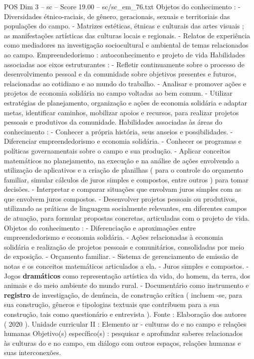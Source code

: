 \begin{textsample}{POS Dim 3 – sc – Score 19.00 – sc/sc\_em\_76.txt}
Objetos do conhecimento : - Diversidades étnico-raciais, de gênero, geracionais, sexuais e territoriais das populações do campo. - Matrizes estéticas, étnicas e culturais das artes visuais ; as manifestações artísticas das culturas locais e regionais. - Relatos de experiência como mediadores na investigação sociocultural e ambiental de temas relacionados ao campo.
Empreendedorismo : autoconhecimento e projeto de vida Habilidades associadas aos eixos estruturantes : - Refletir continuamente sobre o processo de desenvolvimento pessoal e da comunidade sobre objetivos presentes e futuros, relacionadas ao cotidiano e ao mundo do trabalho. - Analisar e promover ações e projetos de economia solidária no campo voltadas ao bem comum. - Utilizar estratégias de planejamento, organização e ações de economia solidária e adaptar metas, identificar caminhos, mobilizar apoios e recursos, para realizar projetos pessoais e produtivos da comunidade.
Habilidades associadas às áreas do conhecimento : - Conhecer a própria história, seus anseios e possibilidades. - Diferenciar empreendedorismo e economia solidária. - Conhecer os programas e políticas governamentais sobre o campo e sua produção. - Aplicar conceitos matemáticos no planejamento, na execução e na análise de ações envolvendo a utilização de aplicativos e a criação de planilhas ( para o controle do orçamento familiar, simular cálculos de juros simples e compostos, entre outros ) para tomar decisões. - Interpretar e comparar situações que envolvam juros simples com as que envolvem juros compostos. - Desenvolver projetos pessoais ou produtivos, utilizando as práticas de linguagem socialmente relevantes, em diferentes campos de atuação, para formular propostas concretas, articuladas com o projeto de vida.
Objetos do conhecimento : - Diferenciação e aproximações entre empreendedorismo e economia solidária. - Ações relacionadas à economia solidária e realização de projetos pessoais e comunitários, consolidadas por meio de exposição. - Orçamento familiar. - Sistema de gerenciamento de emissão de notas e os conceitos matemáticos articulados a ela. - Juros simples e compostos. - Jogos \textbf{dramáticos} como representação artística da vida, do homem, da terra, dos animais e do meio ambiente do mundo rural. - Documentário como instrumento e \textbf{registro} de investigação, de denúncia, de construção crítica ( incluem -se, para sua construção, gêneros e tipologias textuais que contribuem para a sua construção, tais como questionário e entrevista ).
Fonte : Elaboração dos autores ( 2020 ).
Unidade curricular II : Elemento ar - culturas do e no campo e relações humanas Objetivo(s) específico(s) : pesquisar e aprofundar saberes relacionados às culturas do e no campo, em diálogo com outros espaços, relações humanas e suas interconexões.

\end{textsample}
